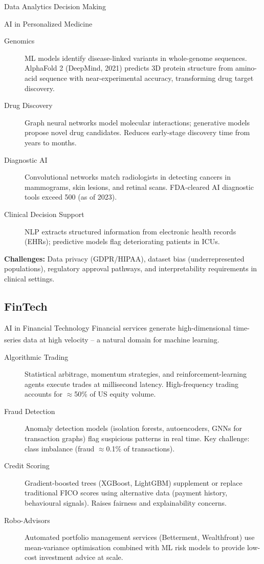 \begin{v3topic}{Data Analytics Decision Making}
\begin{v3topic}{AI in Personalized Medicine}
        \begin{description}
            \item[Genomics] ML models identify disease-linked variants in whole-genome sequences. AlphaFold 2 (DeepMind, 2021) predicts 3D protein structure from amino-acid sequence with near-experimental accuracy, transforming drug target discovery.
            \item[Drug Discovery] Graph neural networks model molecular interactions; generative models propose novel drug candidates. Reduces early-stage discovery time from years to months.
            \item[Diagnostic AI] Convolutional networks match radiologists in detecting cancers in mammograms, skin lesions, and retinal scans. FDA-cleared AI diagnostic tools exceed 500 (as of 2023).
            \item[Clinical Decision Support] NLP extracts structured information from electronic health records (EHRs); predictive models flag deteriorating patients in ICUs.
        \end{description}

        \textbf{Challenges:} Data privacy (GDPR/HIPAA), dataset bias (underrepresented populations), regulatory approval pathways, and interpretability requirements in clinical settings.
\end{v3topic}

    \subsection{FinTech}

\begin{v3topic}{AI in Financial Technology}
        Financial services generate high-dimensional time-series data at high velocity -- a natural domain for machine learning.\textsuperscript{\cite{adjaouteAI2024}}

        \begin{description}
            \item[Algorithmic Trading] Statistical arbitrage, momentum strategies, and reinforcement-learning agents execute trades at millisecond latency. High-frequency trading accounts for $\approx$50\% of US equity volume.
            \item[Fraud Detection] Anomaly detection models (isolation forests, autoencoders, GNNs for transaction graphs) flag suspicious patterns in real time. Key challenge: class imbalance (fraud $\approx$0.1\% of transactions).
            \item[Credit Scoring] Gradient-boosted trees (XGBoost, LightGBM) supplement or replace traditional FICO scores using alternative data (payment history, behavioural signals). Raises fairness and explainability concerns.
            \item[Robo-Advisors] Automated portfolio management services (Betterment, Wealthfront) use mean-variance optimisation combined with ML risk models to provide low-cost investment advice at scale.
        \end{description}
\end{v3topic}


\end{v3topic}

